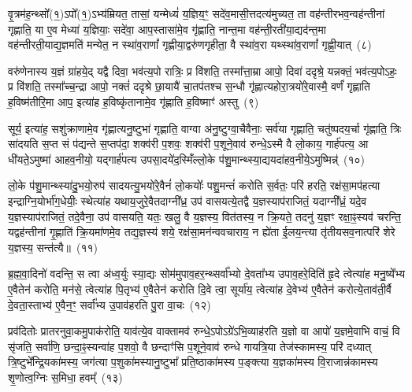 वृ॒त्रम॑ह॒न्थ्सो᳚(१॒)\-ऽपो᳚(१॒)\-ऽभ्य॑म्रियत॒ तासां॒ यन्मेध्यं॑ य॒ज्ञिय॒ꣳ॒ सदे॑व॒मासी॒त्तदत्य॑मुच्यत॒ ता वह॑न्तीरभव॒न्वह॑न्तीनां गृह्णाति॒ या ए॒व मेध्या॑ य॒ज्ञियाः॒ सदे॑वा॒ आप॒स्तासा॑मे॒व गृ॑ह्णाति॒ नान्त॒मा वह॑न्ती॒रती॑या॒द्यद॑न्त॒मा वह॑न्तीरती॒याद्य॒ज्ञमति॑ मन्येत॒ न स्था॑व॒राणां᳚ गृह्णीया॒द्वरु॑णगृहीता॒ वै स्था॑व॒रा यथ्स्था॑व॒राणां᳚ गृह्णी॒यात्~(८)\ip

वरु॑णेनास्य य॒ज्ञं ग्रा॑हये॒द् यद्वै दिवा॒ भव॑त्य॒पो रात्रिः॒ प्र वि॑शति॒ तस्मा᳚त्ता॒म्रा आपो॒ दिवा॑ ददृश्रे॒ यन्नक्तं॒ भव॑त्य॒पो\-ऽहः॒ प्र वि॑शति॒ तस्मा᳚च्च॒न्द्रा आपो॒ नक्तं॑ ददृश्रे छा॒यायै॑ चा॒तप॑तश्च स॒न्धौ गृ॑ह्णात्यहोरा॒त्रयो॑रे॒वास्मै॒ वर्णं॑ गृह्णाति ह॒विष्म॑तीरि॒मा आप॒ इत्या॑ह ह॒विष्कृ॑तानामे॒व गृ॑ह्णाति ह॒विष्माꣳ॑ अस्तु~(९)\ip

सूर्य॒ इत्या॑ह॒ सशु॑क्राणामे॒व गृ॑ह्णात्यनु॒ष्टुभा॑ गृह्णाति॒ वाग्वा अ॑नु॒ष्टुग्वा॒चैवैनाः॒ सर्व॑या गृह्णाति॒ चतु॑ष्पदय॒र्चा गृ॑ह्णाति॒ त्रिः सा॑दयति स॒प्त सं प॑द्यन्ते स॒प्तप॑दा॒ शक्व॑री प॒शवः॒ शक्व॑री प॒शूने॒वाव॑ रुन्धे॒\-ऽस्मै वै लो॒काय॒ गार्\mbox{}ह॑पत्य॒ आ धी॑यते॒\-ऽमुष्मा॑ आहव॒नीयो॒ यद्गार्\mbox{}ह॑पत्य उपसा॒दये॑द॒स्मिँल्लो॒के प॑शु॒मान्थ्स्या॒द्ययदा॑हव॒नीये॒\-ऽमुष्मिन्न्॑~(१०)\ip

लो॒के प॑शु॒मान्थ्स्या॑दु॒भयो॒रुप॑ सादयत्यु॒भयो॑रे॒वैनं॑ लो॒कयोः᳚ पशु॒मन्तं॑ करोति स॒र्वतः॒ परि॑ हरति॒ रक्ष॑सा॒मप॑हत्या इन्द्राग्नि॒योर्भा॑ग॒धेयीः॒ स्थेत्या॑ह यथाय॒जुरे॒वैतदाग्नी᳚ध्र॒ उप॑ वासयत्ये॒तद्वै य॒ज्ञस्याप॑राजितं॒ यदाग्नी᳚ध्रं॒ यदे॒व य॒ज्ञस्याप॑राजितं॒ तदे॒वैना॒ उप॑ वासयति॒ यतः॒ खलु॒ वै य॒ज्ञस्य॒ वित॑तस्य॒ न क्रि॒यते॒ तदनु॑ य॒ज्ञꣳ रक्षा॒ꣴ॒स्यव॑ चरन्ति॒ यद्वह॑न्तीनां गृ॒ह्णाति॑ क्रि॒यमा॑णमे॒व तद्य॒ज्ञस्य॑ शये॒ रक्ष॑सा॒मन॑न्ववचाराय॒ न ह्ये॑ता ई॒लय॒न्त्या तृ॑तीय\-सव॒नात्परि॑ शेरे य॒ज्ञस्य॒ सन्त॑त्यै॥~(११)\ip

{\anuvakamend[{स्या॒दिन्द्रो॑ गृह्णी॒याद॑स्त्व॒मुष्मि॑न्क्रि॒यते॒ षड्विꣳ॑शतिश्च}]}

ब्र॒ह्म॒वा॒दिनो॑ वदन्ति॒ स त्वा अ॑ध्व॒र्युः स्या॒द्यः सोम॑मुपाव॒हर॒न्थ्सर्वा᳚भ्यो दे॒वता᳚भ्य उपाव॒हरे॒दिति॑ हृ॒दे त्वेत्या॑ह मनु॒ष्ये᳚भ्य ए॒वैतेन॑ करोति॒ मन॑से॒ त्वेत्या॑ह पि॒तृभ्य॑ ए॒वैतेन॑ करोति दि॒वे त्वा॒ सूर्या॑य॒ त्वेत्या॑ह दे॒वेभ्य॑ ए॒वैतेन॑ करोत्ये॒ताव॑ती॒र्वै दे॒वता॒स्ताभ्य॑ ए॒वैन॒ꣳ॒ सर्वा᳚भ्य उ॒पाव॑हरति पु॒रा वा॒चः~(१२)\ip

प्रव॑दितोः प्रातरनुवा॒कमु॒पा\-क॑रोति॒ याव॑त्ये॒व वाक्तामव॑ रुन्धे॒\-ऽपो\-ऽग्रे॑\-ऽभि॒व्याह॑रति य॒ज्ञो वा आपो॑ य॒ज्ञमे॒वाभि वाचं॒ वि सृ॑जति॒ सर्वा॑णि॒ छन्दा॒ꣴ॒स्यन्वा॑ह प॒शवो॒ वै छन्दाꣳ॑सि प॒शूने॒वाव॑ रुन्धे गायत्रि॒या तेज॑स्कामस्य॒ परि॑ दध्यात् त्रि॒ष्टुभे᳚न्द्रि॒यका॑मस्य॒ जग॑त्या प॒शुका॑मस्यानु॒ष्टुभा᳚ प्रति॒ष्ठाका॑मस्य प॒ङ्क्त्या य॒ज्ञका॑मस्य वि॒राजान्न॑कामस्य शृ॒णोत्व॒ग्निः स॒मिधा॒ हवम्᳚~(१३)\ip

